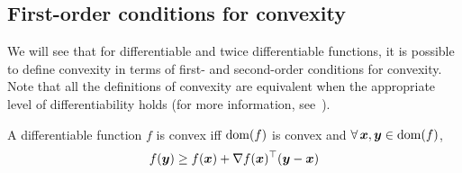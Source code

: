 \documentclass{article}
\begin{document}


\subsection{First-order conditions for convexity}
\label{subsec:convexAnalysis:firstOrderConditionsForConvexity}
We will see that for differentiable and twice differentiable functions, it is possible to define convexity in terms of first- and second-order conditions for convexity.
Note that all the definitions of convexity are equivalent when the appropriate level of differentiability holds (for more information, see~\cite{bubeck2015convex}).

\begin{lemma}\label{lemma:first}
A differentiable function $f$ is convex iff $\operatorname{dom}(f)$ is convex and $\forall \vx, \vy \in \dom(f)$,
\[
	f({\bm{y}}) \geq f({\bm{x}}) + \nabla f({\bm{x}})^\top({\bm{y}}-{\bm{x}})
\]
\end{lemma}
\end{document}
